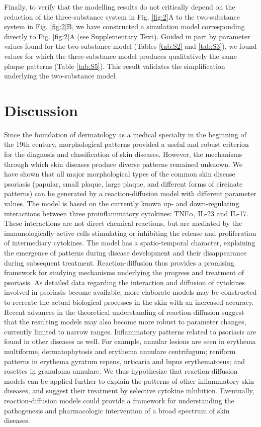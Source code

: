 Finally, to verify that the modelling results do not critically depend on the reduction of the three-substance system in Fig. \ref{fig:2}A to the two-substance system in Fig. \ref{fig:2}B, we have constructed a simulation model corresponding directly to Fig. \ref{fig:2}A (see Supplementary Text). Guided in part by parameter values found for the two-substance model (Tables \ref{tab:S2} and \ref{tab:S3}), we found values for which the three-substance model produces qualitatively the same plaque patterns (Table \ref{tab:S5}). This result validates the simplification underlying the two-substance model.


\section{Discussion}
Since the foundation of dermatology as a medical specialty in the beginning of the 19th century, morphological patterns provided a useful and robust criterion for the diagnosis and classification of skin diseases. However, the mechanisms through which skin diseases produce diverse patterns remained unknown. We have shown that all major morphological types of the common skin disease psoriasis (papular, small plaque, large plaque, and different forms of circinate patterns) can be generated by a reaction-diffusion model with different parameter values. The model is based on the currently known up- and down-regulating interactions between three proinflammatory cytokines: TNF$\alpha$, IL-23 and IL-17. These interactions are not direct chemical reactions, but are mediated by the immunologically active cells stimulating or inhibiting the release and proliferation of intermediary cytokines. The model has a spatio-temporal character, explaining the emergence of patterns during disease development and their disappearance during subsequent treatment. Reaction-diffusion thus provides a promising framework for studying mechanisms underlying the progress and treatment of psoriasis. As detailed data regarding the interaction and diffusion of cytokines involved in psoriasis become available, more elaborate models may be constructed to recreate the actual biological processes in the skin with an increased accuracy. Recent advances in the theoretical understanding of reaction-diffusion \citep{diego2018} suggest that the resulting models may also become more robust to parameter changes, currently limited to narrow ranges. Inflammatory patterns related to psoriasis are found in other diseases as well. For example, annular lesions are seen in erythema multiforme, dermatophytosis and erythema annulare centrifugum; reniform patterns in erythema gyratum repens, urticaria and lupus erythematosus; and rosettes in granuloma annulare. We thus hypothesize that reaction-diffusion models can be applied further to explain the patterns of other inflammatory skin diseases, and suggest their treatment by selective cytokine inhibition. Eventually, reaction-diffusion models could provide a framework for understanding the pathogenesis and pharmacologic intervention of a broad spectrum of skin diseases. 

